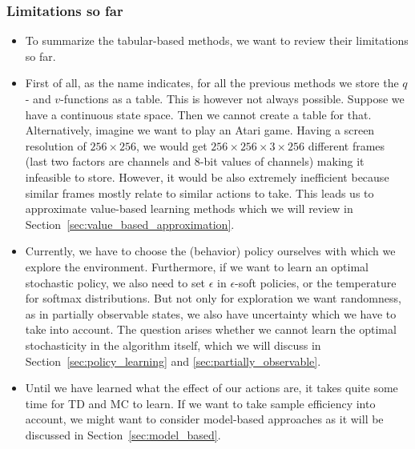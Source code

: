 \subsubsection{Limitations so far}
\begin{itemize}
	\item To summarize the tabular-based methods, we want to review their limitations so far.
	\item First of all, as the name indicates, for all the previous methods we store the $q$- and $v$-functions as a table. This is however not always possible. Suppose we have a continuous state space. Then we cannot create a table for that. Alternatively, imagine we want to play an Atari game. Having a screen resolution of $256\times 256$, we would get $256\times 256\times 3\times 256$ different frames (last two factors are channels and 8-bit values of channels) making it infeasible to store. However, it would be also extremely inefficient because similar frames mostly relate to similar actions to take. This leads us to approximate value-based learning methods which we will review in Section~\ref{sec:value_based_approximation}.
	\item Currently, we have to choose the (behavior) policy ourselves with which we explore the environment. Furthermore, if we want to learn an optimal stochastic policy, we also need to set $\epsilon$ in $\epsilon$-soft policies, or the temperature for softmax distributions. But not only for exploration we want randomness, as in partially observable states, we also have uncertainty which we have to take into account. The question arises whether we cannot learn the optimal stochasticity in the algorithm itself, which we will discuss in Section~\ref{sec:policy_learning} and \ref{sec:partially_observable}.
	\item Until we have learned what the effect of our actions are, it takes quite some time for TD and MC to learn. If we want to take sample efficiency into account, we might want to consider model-based approaches as it will be discussed in Section~\ref{sec:model_based}.
\end{itemize}